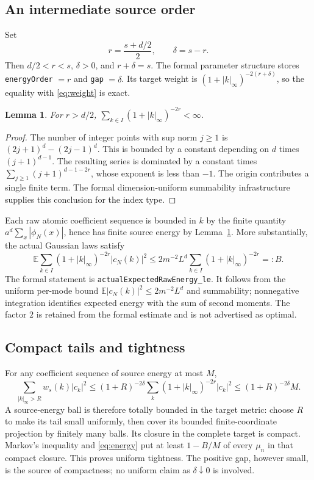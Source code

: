 \documentclass[11pt]{amsart}
\newtheorem{lemma}[theorem]{Lemma}
\theoremstyle{remark}\newtheorem{remark}[theorem]{Remark}
\newcommand{\E}{\mathbb E}\newcommand{\Prob}{\mathcal P}
\begin{document}
\subsection{An intermediate source order}
Set
\begin{equation}\label{eq:source}
 r=\frac{s+d/2}{2},\qquad \delta=s-r.
\end{equation}
Then $d/2<r<s$, $\delta>0$, and $r+\delta=s$. The formal parameter structure stores \texttt{energyOrder} $=r$ and \texttt{gap} $=\delta$. Its target weight is $(1+|k|_\infty)^{-2(r+\delta)}$, so the equality with \eqref{eq:weight} is exact.

\begin{lemma}\label{lem:summable}
For $r>d/2$, $\sum_{k\in I}(1+|k|_\infty)^{-2r}<\infty$.
\end{lemma}
\begin{proof}
The number of integer points with sup norm $j\ge1$ is
$(2j+1)^d-(2j-1)^d$. This is bounded by a constant depending on $d$ times $(j+1)^{d-1}$. The resulting series is dominated by a constant times $\sum_{j\ge1}(j+1)^{d-1-2r}$, whose exponent is less than $-1$. The origin contributes a single finite term. The formal dimension-uniform summability infrastructure supplies this conclusion for the index type.
\end{proof}

Each raw atomic coefficient sequence is bounded in $k$ by the finite quantity $a^d\sum_x|\phi_N(x)|$, hence has finite source energy by Lemma~\ref{lem:summable}. More substantially, the actual Gaussian laws satisfy
\begin{equation}\label{eq:energy}
 \E\sum_{k\in I}(1+|k|_\infty)^{-2r}|c_N(k)|^2
 \le 2m^{-2}L^d\sum_{k\in I}(1+|k|_\infty)^{-2r}=:B.
\end{equation}
The formal statement is \texttt{actualExpectedRawEnergy\_le}. It follows from the uniform per-mode bound $\E|c_N(k)|^2\le 2m^{-2}L^d$ and summability; nonnegative integration identifies expected energy with the sum of second moments. The factor $2$ is retained from the formal estimate and is not advertised as optimal.

\subsection{Compact tails and tightness}
For any coefficient sequence of source energy at most $M$,
\begin{equation}\label{eq:tail}
 \sum_{|k|_\infty>R}w_s(k)|c_k|^2
 \le(1+R)^{-2\delta}\sum_k(1+|k|_\infty)^{-2r}|c_k|^2
 \le (1+R)^{-2\delta}M.
\end{equation}
A source-energy ball is therefore totally bounded in the target metric: choose $R$ to make its tail small uniformly, then cover its bounded finite-coordinate projection by finitely many balls. Its closure in the complete target is compact. Markov's inequality and \eqref{eq:energy} put at least $1-B/M$ of every $\mu_n$ in that compact closure. This proves uniform tightness. The positive gap, however small, is the source of compactness; no uniform claim as $\delta\downarrow0$ is involved.
\end{document}

